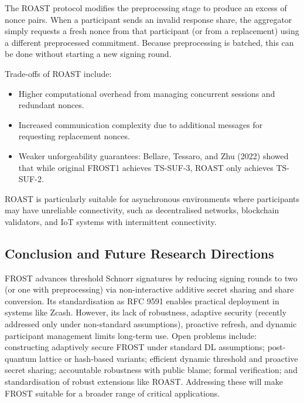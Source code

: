 The ROAST protocol modifies the preprocessing stage to produce an excess of nonce pairs. When a participant sends an invalid response share, the aggregator simply requests a fresh nonce from that participant (or from a replacement) using a different preprocessed commitment. Because preprocessing is batched, this can be done without starting a new signing round.

Trade-offs of ROAST include:
\begin{itemize}
    \item Higher computational overhead from managing concurrent sessions and redundant nonces.
    \item Increased communication complexity due to additional messages for requesting replacement nonces.
    \item Weaker unforgeability guarantees: Bellare, Tessaro, and Zhu (2022) showed that while original FROST1 achieves TS-SUF-3, ROAST only achieves TS-SUF-2.
\end{itemize}

ROAST is particularly suitable for asynchronous environments where participants may have unreliable connectivity, such as decentralised networks, blockchain validators, and IoT systems with intermittent connectivity.

\subsection{Conclusion and Future Research Directions}

FROST advances threshold Schnorr signatures by reducing signing rounds to two (or one with preprocessing) via non-interactive additive secret sharing and share conversion. Its standardisation as RFC 9591 enables practical deployment in systems like Zcash. However, its lack of robustness, adaptive security (recently addressed only under non-standard assumptions), proactive refresh, and dynamic participant management limits long-term use. Open problems include: constructing adaptively secure FROST under standard DL assumptions; post-quantum lattice or hash-based variants; efficient dynamic threshold and proactive secret sharing; accountable robustness with public blame; formal verification; and standardisation of robust extensions like ROAST. Addressing these will make FROST suitable for a broader range of critical applications.